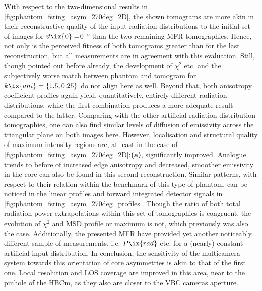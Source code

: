                 With respect to the two-dimensional results in \cref{fig:phantom_fsring_asym_270deg_2D}, the shown tomograms are more akin in their reconstructive quality of the input radiation distributions to the initial set of images for $\vartheta\ix{0}=$\SI{0}{\degree} than the two remaining MFR tomographies. Hence, not only is the perceived fitness of both tomograms greater than for the last reconstruction, but all measurements are in agreement with this evaluation. Still, though pointed out before already, the development of $\chi^{2}$ etc. and the subjectively worse match between phantom and tomogram for $k\ix{ani}=\left\{1.5, 0.25\right\}$ do not align here as well. Beyond that, both anisotropy coefficient profiles again yield, quantitatively, entirely different radiation distributions, while the first combination produces a more adequate result compared to the latter. Comparing with the other artificial radiation distribution tomographies, one can also find similar levels of diffusion of emissivity across the triangular plane on both images here. However, localisation and structural quality of maximum intensity regions are, at least in the case of \cref{fig:phantom_fsring_asym_270deg_2D}:\textbf{(a)}, significantly improved. Analogue trends to before of increased edge anisotropy and decreased, smoother emissivity in the core can also be found in this second reconstruction. Similar patterns, with respect to their relation within the benchmark of this type of phantom, can be noticed in the linear profiles and forward integrated detector signals in \cref{fig:phantom_fsring_asym_270deg_profiles}. Though the ratio of both total radiation power extrapolations within this set of tomographies is congruent, the evolution of $\chi^{2}$ and MSD profile or maximum is not, which previously was also the case. Additionally, the presented MFR have provided yet another noticeably different sample of measurements, i.e. $P\ix{rad}$ etc. for a (nearly) constant artificial input distribution. In conclusion, the sensitivity of the multicamera system towards this orientation of core asymmetries is akin to that of the first one. Local resolution and LOS coverage are improved in this area, near to the pinhole of the HBCm, as they also are closer to the VBC cameras aperture.\\%
%
                \newline%
